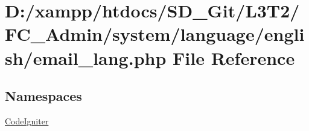 \hypertarget{_admin_2system_2language_2english_2email__lang_8php}{}\section{D\+:/xampp/htdocs/\+S\+D\+\_\+\+Git/\+L3\+T2/\+F\+C\+\_\+\+Admin/system/language/english/email\+\_\+lang.php File Reference}
\label{_admin_2system_2language_2english_2email__lang_8php}
\subsection*{Namespaces}
\begin{DoxyCompactItemize}
\item 
 \hyperlink{namespace_code_igniter}{Code\+Igniter}
\end{DoxyCompactItemize}
